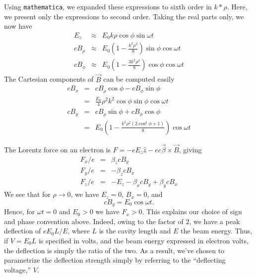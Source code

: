 Using {\tt mathematica}, we expanded these expressions to sixth order
in $k*\rho$.  Here, we present only the expressions to second
order. Taking the real parts only, we now have
\begin{eqnarray}
E_z & \approx & E_0 k \rho \cos \phi \sin \omega t \\
c B_\rho  & \approx & E_0 \left(1 - \frac{k^2 \rho^2}{8}\right)\sin\phi \cos\omega t \\
c B_\phi  & \approx & E_0 \left(1 - \frac{3 k^2 \rho^2}{8}\right)\cos\phi \cos\omega t 
\end{eqnarray}
The Cartesian components of $\vec{B}$ can be computed easily
\begin{eqnarray}
c B_x & = & c B_\rho\cos\phi - c B_\phi\sin\phi \\
      & = & \frac{E_0}{4} \rho^2 k^2 \cos\phi \sin\phi \cos\omega t \\
c B_y & = & c B_\rho\sin\phi + c B_\phi\cos\phi \\
      & = & E_0 \left(1 - \frac{k^2\rho^2 (2 \cos^2\phi + 1)}{8}\right) \cos\omega t 
\end{eqnarray}

The Lorentz force on an electron is $F = -e E_z \hat{z} - e c \vec{\beta} \times \vec{B}$,
giving
\begin{eqnarray}
F_x/e & = & \beta_z c B_y \\
F_y/e & = & -\beta_z c B_x \\
F_z/e & = & -E_z - \beta_x c B_y + \beta_y c B_x 
\end{eqnarray}
We see that for $\rho \rightarrow 0$, we have $E_z = 0$, $B_x = 0$, and
\begin{equation}
c B_y = E_0 \cos \omega t.
\end{equation}
Hence, for $\omega t=0$ and $E_0>0$ we have $F_x>0$.  This explains
our choice of sign and phase convention above.  Indeed, owing to the
factor of $2$, we have a peak deflection of $e E_0 L/E$, where $L$ is
the cavity length and $E$ the beam energy.  Thus, if $V = E_0 L$ is
specified in volts, and the beam energy expressed in electron volts,
the deflection is simply the ratio of the two.  As a result, we've
chosen to parametrize the deflection strength simply by referring to
the ``deflecting voltage,'' $V$.
